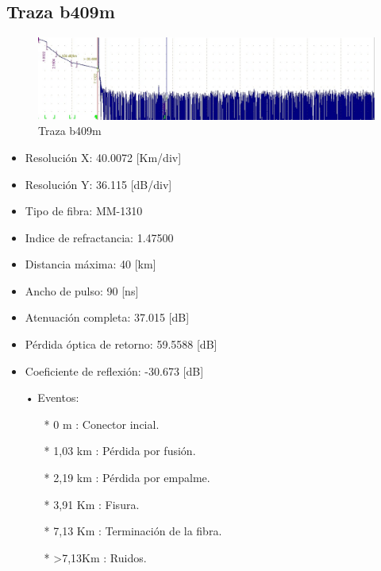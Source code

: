 \documentclass{article}
\begin{document}
\subsection{Traza b409m}

\begin{figure}[h]
 \begin{center}
	\includegraphics[width=\textwidth]{imagenes/sim1.jpg} 
	\caption{Traza b409m}\label{fig:fig1}
 \end{center}
\end{figure}

\begin{itemize}\itemsep0em \itemindent=2em
\item Resolución X: 40.0072 [Km/div]
\item Resolución Y:	36.115 [dB/div]
\item Tipo de fibra: MM-1310
\item Indice de refractancia: 1.47500
\item Distancia máxima: 40 [km]
\item Ancho de pulso: 90 [ns]
\item Atenuación completa: 37.015 [dB]
\item Pérdida óptica de retorno: 59.5588 [dB]
\item Coeficiente de reflexión: -30.673 [dB]
\end{itemize}

\begin{itemize}\itemsep0em \itemindent=2em
\item[•]Eventos:
	\begin{itemize}\itemsep0em \itemindent=2em
		\item[*] 0 m 	 : Conector incial.
		\item[*] 1,03 km : Pérdida por fusión.
		\item[*] 2,19 km : Pérdida por empalme.
		\item[*] 3,91 Km : Fisura.
		\item[*] 7,13 Km : Terminación de la fibra.
		\item[*] >7,13Km : Ruidos.
	\end{itemize}
\end{itemize}
\end{document}
